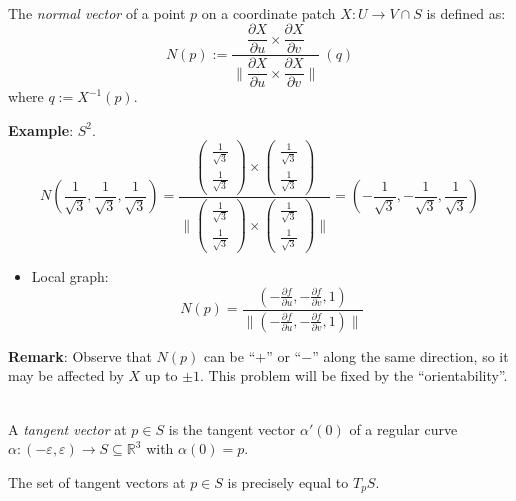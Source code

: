 \\
The \textit{normal vector} of a point $p$ on a coordinate patch $X: U\to V\cap S$ is defined as:
\[
N(p) := \frac{\dfrac{\partial X}{\partial u}\times\dfrac{\partial X}{\partial v}}{\big\|\dfrac{\partial X}{\partial u}\times\dfrac{\partial X}{\partial v}\big\|}\ (q)
\]
where $q := X^{-1}(p)$.

\noindent\textbf{Example}: $S^2$.
\[
N\left(\frac{1}{\sqrt{3}}, \frac{1}{\sqrt{3}}, \frac{1}{\sqrt{3}}\right) = \frac{\begin{pmatrix}\frac{1}{\sqrt{3}}\\ \frac{1}{\sqrt{3}}\end{pmatrix}\times\begin{pmatrix}\frac{1}{\sqrt{3}}\\ \frac{1}{\sqrt{3}}\end{pmatrix}}{\big\|\begin{pmatrix}\frac{1}{\sqrt{3}}\\ \frac{1}{\sqrt{3}}\end{pmatrix}\times\begin{pmatrix}\frac{1}{\sqrt{3}}\\ \frac{1}{\sqrt{3}}\end{pmatrix}\big\|} = \left(-\frac{1}{\sqrt{3}}, -\frac{1}{\sqrt{3}}, \frac{1}{\sqrt{3}}\right)
\]

\noindent\begin{itemize}
\item Local graph:
\[
N(p) = \frac{\left(-\frac{\partial f}{\partial u}, -\frac{\partial f}{\partial v}, 1\right)}{\big\|\left(-\frac{\partial f}{\partial u}, -\frac{\partial f}{\partial v}, 1\right)\big\|}
\]
\end{itemize}

\noindent\textbf{Remark}: Observe that $N(p)$ can be ``$+$'' or ``$-$'' along the same direction, so it may be affected by $X$ up to $\pm 1$. This problem will be fixed by the ``orientability''.

\\
A \textit{tangent vector} at $p\in S$ is the tangent vector $\alpha'(0)$ of a regular curve $\alpha: (-\varepsilon, \varepsilon)\to S\subseteq\mathbb{R}^3$ with $\alpha(0) = p$.

\begin{proposition}
The set of tangent vectors at $p\in S$ is precisely equal to $T_pS$.
\end{proposition}

